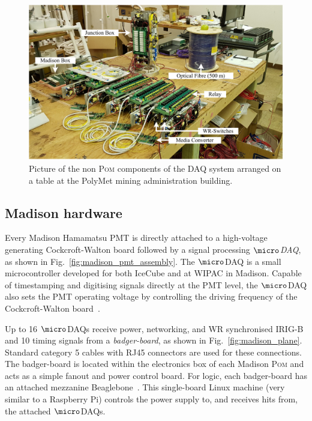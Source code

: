 \begin{figure} %
    \includegraphics[width=\textwidth]{diagrams/5-daq/full_setup.pdf}
    \caption[Picture of the non \textsc{Pom} components of the \chipsfive DAQ system]
    {Picture of the non \textsc{Pom} components of the \chipsfive DAQ system arranged on a table
        at the PolyMet mining administration building.}
    \label{fig:full_setup}
\end{figure}

\subsection{Madison hardware} %
\label{sec:daq_hard_madison} %

Every Madison Hamamatsu PMT is directly attached to a high-voltage generating Cockcroft-Walton
board followed by a signal processing \emph{$\micro$DAQ}, as shown in
Fig.~\ref{fig:madison_pmt_assembly}. The $\micro$DAQ is a small microcontroller developed for both
IceCube and \chips at WIPAC in Madison. Capable of timestamping and digitising signals directly at
the PMT level, the $\micro$DAQ also sets the PMT operating voltage by controlling the driving
frequency of the Cockcroft-Walton board~\cite{eijk2018}.

Up to 16 $\micro$DAQs receive power, networking, and WR synchronised IRIG-B and
\unit{10}{} timing signals from a \emph{badger-board}, as shown in
Fig.~\ref{fig:madison_plane}. Standard category 5 cables with RJ45 connectors are used for these
connections. The badger-board is located within the electronics box of each Madison \textsc{Pom}
and acts as a simple fanout and power control board. For logic, each badger-board has an attached
mezzanine Beaglebone~\cite{beagle2020}. This single-board Linux machine (very similar to a
Raspberry Pi) controls the power supply to, and receives hits from, the attached $\micro$DAQs.

